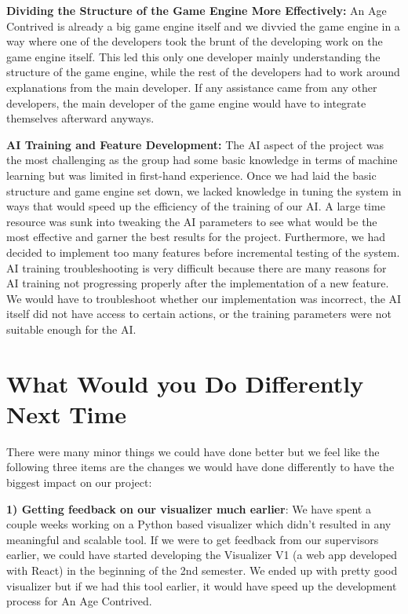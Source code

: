 \documentclass{article}
\begin{document}
\textbf{Dividing the Structure of the Game Engine More Effectively:} An Age Contrived is already a big game engine itself and we divvied the game engine in a way where one of the developers took the brunt of the developing work on the game engine itself. This led this only one developer mainly understanding the structure of the game engine, while the rest of the developers had to work around explanations from the main developer. If any assistance came from any other developers, the main developer of the game engine would have to integrate themselves afterward anyways. 

\textbf{AI Training and Feature Development:} The AI aspect of the project was the most challenging as the group had some basic knowledge in terms of machine learning but was limited in first-hand experience. Once we had laid the basic structure and game engine set down, we lacked knowledge in tuning the system in ways that would speed up the efficiency of the training of our AI. A large time resource was sunk into tweaking the AI parameters to see what would be the most effective and garner the best results for the project. Furthermore, we had decided to implement too many features before incremental testing of the system. AI training troubleshooting is very difficult because there are many reasons for AI training not progressing properly after the implementation of a new feature. We would have to troubleshoot whether our implementation was incorrect, the AI itself did not have access to certain actions, or the training parameters were not suitable enough for the AI. 



\section{What Would you Do Differently Next Time}
There were many minor things we could have done better but we feel like the following three items are the changes we would have done differently to have the biggest impact on our project:


\textbf{1) Getting feedback on our visualizer much earlier}: We have spent a couple weeks working on a Python based visualizer which didn't resulted in any meaningful and scalable tool. If we were to get feedback from our supervisors earlier, we could have started developing the Visualizer V1 (a web app developed with React) in the beginning of the 2nd semester. We ended up with pretty good visualizer but if we had this tool earlier, it would have speed up the development process for An Age Contrived.
\end{document}
